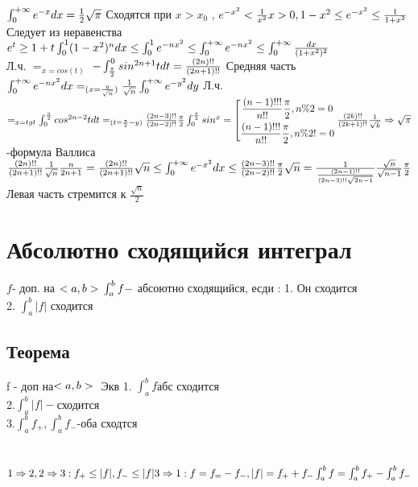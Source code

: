 \documentclass[12pt, a4paper]{article}
\begin{document}
	$ \int_0^{+\infty} e^{-x} dx =\frac{1}{2}\sqrt{\pi}\\ $
	Сходятся при $x > x_0$ , $ e^{-x^2}<\frac{1}{x^2}\\
	x>0, 1- x^2 \leq  e^{-x^2}\leq \frac{1}{1+x^2}\\ $
	Следует из неравенства $e^t \geq 1+ t\\
	\int_0^1 (1-x^2)^n  dx \leq \int_0^1 e^{-nx^2} \leq \int_0^{+\infty} e^{-nx^2} \leq \int_0^{+\infty}\frac{dx}{(1+x^2)^2} $\\
	Л.ч. $=_{x=cos(t)} $  $ -\int_{\frac{\pi}{2}}^0 sin^{2n+1}t dt =\frac{(2n)!!}{(2n+1)!!} \\$
	Средняя часть $ \int_0^{+\infty} e^{-nx^2}dx =_{(x=\frac{y}{\sqrt{n}})} \frac{1}{\sqrt{n}}\int_0^{+\infty} e^{-y^2} dy\\ $
	Л.ч. $ =_{x=tgt} \int_0^{\frac{\pi}{2}} cos^{2n-2}t dt =_{(t=\frac{\pi}{2}-y)} \frac{(2n-3)!!}{(2n-2)!!}\frac{\pi}{2}\\  
	\int_0^{\frac{\pi}{2}}sin^x=
	\left[
	\begin{gathered} 
	\frac{(n-1)!!!}{n!!} \frac{\pi}{2}, n \% 2 =0
	\\
	\frac{(n-1)!!!}{n!!} \frac{\pi}{2} , n \% 2 !=0
	\\
	\end{gathered} 
	\right. \\
	\frac{(2k)!!}{(2k+1)!!}\frac{1}{\sqrt{k}} \Rightarrow \sqrt{\pi} $ -формула Валлиса \\
	$ \frac{(2n)!!}{(2n+1)!!} \frac{1}{\sqrt{n}}\frac{n}{2n+1}=\frac{(2n)!!}{(2n+1)!!}\sqrt{n} \leq \int_0^{+\infty} e^{-x^2} dx\leq \frac{(2n-3)!!}{(2n-2)!!}\frac{\pi}{2}\sqrt{n}=\frac{1}{\frac{(2n-1)!!}{(2n-3)!! \sqrt{2n-1}}}\frac{\sqrt{n}}{\sqrt{n-1}}\frac{\pi}{2}\\
	$ Левая часть стремится к $ \frac{\sqrt{n}}{2} $\\
	
	\section{Абсолютно сходящийся интеграл}
	$ f $- доп. на $ <a,b>\\
	\int_a^b f -$ абсоютно сходящийся, есди :
	1. Он сходится \\
	2. $ \int_a^b |f| $ сходится\\
	
	\subsection{Теорема}
	f - доп на$ <a,b>\\$
	Экв 1. $\int_a^b f $абс сходится\\
	2.$ \int_a^b |f| -$сходится\\
	3.$ \int_a^b f_+, \int_a^b f_- $-оба сходтся\\
	\\
	\\
	$ 1\Rightarrow2, 2 \Rightarrow 3 : f_+\leq|f|, f_-\leq|f| \\
	3 \Rightarrow 1 : f = f_= - f_- , |f| = f_+ + f_- \\
	\int_a^b f = \int_a^b f_+ - \int_a^b f_- \\ $   
	
\end{document}
